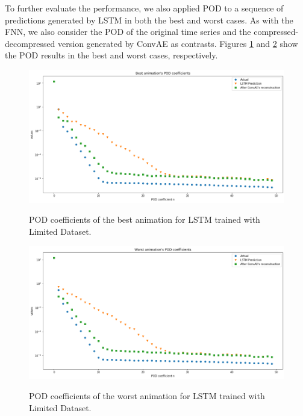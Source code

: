 To further evaluate the performance, we also applied POD to a sequence of predictions generated by LSTM in both the best and worst cases. As with the FNN, we also consider the POD of the original time series and the compressed-decompressed version generated by ConvAE as contrasts. Figures \ref{figure:LSTM_limited_best_POD} and \ref{figure:LSTM_limited_worst_POD} show the POD results in the best and worst cases, respectively.

\begin{figure}[H]
    \centering
    \caption{POD coefficients of the best animation for LSTM trained with Limited Dataset.}
    \includegraphics[scale=0.4]{figures/mantle_convection_images/limited_dataset/LSTM_Best_POD.png}
    \label{figure:LSTM_limited_best_POD}
\end{figure}

\begin{figure}[H]
    \centering
    \caption{POD coefficients of the worst animation for LSTM trained with Limited Dataset.}
    \includegraphics[scale=0.4]{figures/mantle_convection_images/limited_dataset/LSTM_Worst_POD.png}
    \label{figure:LSTM_limited_worst_POD}
\end{figure}

